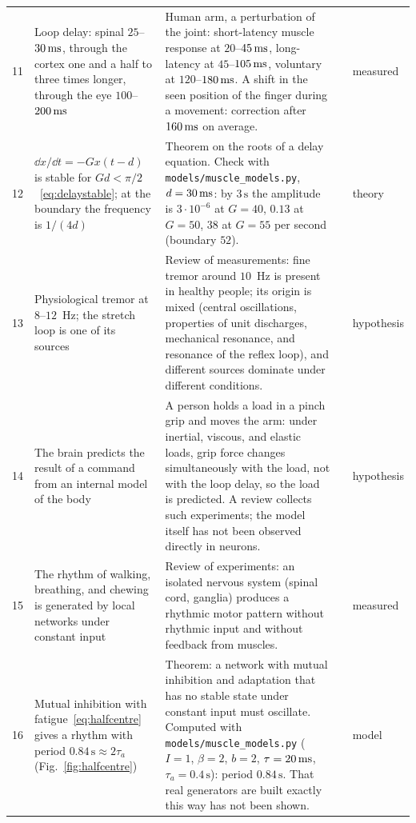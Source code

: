 {\begin{longtable}{>{\raggedright}p{0.5cm}>{\raggedright}p{4.0cm}>{\raggedright}p{5.6cm}>{\raggedright}p{2.3cm}>{\raggedright\arraybackslash}p{1.7cm}}
11 & Loop delay: spinal $25$--$30\,\text{ms}$, through the cortex one and a half to three times longer, through the eye $100$--$200\,\text{ms}$ & Human arm, a perturbation of the joint: short-latency muscle response at $20$--$45\,\text{ms}$, long-latency at $45$--$105\,\text{ms}$, voluntary at $120$--$180\,\text{ms}$. A shift in the seen position of the finger during a movement: correction after $160\,\text{ms}$ on average. & \cite{Pruszynski2008rapid, SaundersKnill2003vis} & measured \\
12 & $\dd x/\dd t=-Gx(t-d)$ is stable for $Gd<\pi/2$~\eqref{eq:delaystable}; at the boundary the frequency is $1/(4d)$ & Theorem on the roots of a delay equation. Check with \texttt{models/\allowbreak muscle\_\allowbreak models.py}, $d=30\,\text{ms}$: by $3\,\text{s}$ the amplitude is $3\cdot10^{-6}$ at $G=40$, $0.13$ at $G=50$, $38$ at $G=55$ per second (boundary $52$). & \cite{Hayes1950} & theory \\
13 & Physiological tremor at $8$--$12$~Hz; the stretch loop is one of its sources & Review of measurements: fine tremor around $10$~Hz is present in healthy people; its origin is mixed (central oscillations, properties of unit discharges, mechanical resonance, and resonance of the reflex loop), and different sources dominate under different conditions. & \cite{McAuleyMarsden2000} & hypothesis \\
14 & The brain predicts the result of a command from an internal model of the body & A person holds a load in a pinch grip and moves the arm: under inertial, viscous, and elastic loads, grip force changes simultaneously with the load, not with the loop delay, so the load is predicted. A review collects such experiments; the model itself has not been observed directly in neurons. & \cite{FlanaganWing1997grip, WolpertGhahramani2000} & hypothesis \\
15 & The rhythm of walking, breathing, and chewing is generated by local networks under constant input & Review of experiments: an isolated nervous system (spinal cord, ganglia) produces a rhythmic motor pattern without rhythmic input and without feedback from muscles. & \cite{MarderBucher2001} & measured \\
16 & Mutual inhibition with fatigue~\eqref{eq:halfcentre} gives a rhythm with period $0.84\,\text{s}\approx2\tau_a$ (Fig.~\ref{fig:halfcentre}) & Theorem: a network with mutual inhibition and adaptation that has no stable state under constant input must oscillate. Computed with \texttt{models/\allowbreak muscle\_\allowbreak models.py} ($I=1$, $\beta=2$, $b=2$, $\tau=20\,\text{ms}$, $\tau_a=0.4\,\text{s}$): period $0.84\,\text{s}$. That real generators are built exactly this way has not been shown. & \cite{Matsuoka1985osc} & model \\
\bottomrule
\end{longtable}}

